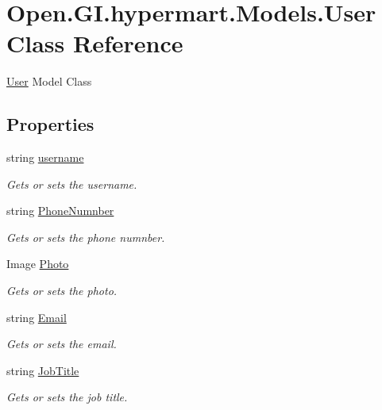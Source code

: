 \hypertarget{class_open_1_1_g_i_1_1hypermart_1_1_models_1_1_user}{}\section{Open.\+G\+I.\+hypermart.\+Models.\+User Class Reference}
\label{class_open_1_1_g_i_1_1hypermart_1_1_models_1_1_user}


\hyperlink{class_open_1_1_g_i_1_1hypermart_1_1_models_1_1_user}{User} Model Class  


\subsection*{Properties}
\begin{DoxyCompactItemize}
\item 
string \hyperlink{class_open_1_1_g_i_1_1hypermart_1_1_models_1_1_user_a8681bb284b2bce5e87537a5dedc2dc05}{username}
\begin{DoxyCompactList}\small\item\em Gets or sets the username. \end{DoxyCompactList}\item 
string \hyperlink{class_open_1_1_g_i_1_1hypermart_1_1_models_1_1_user_a70e545515c09bf8fc7a646c8f1a883a2}{Phone\+Numnber}
\begin{DoxyCompactList}\small\item\em Gets or sets the phone numnber. \end{DoxyCompactList}\item 
Image \hyperlink{class_open_1_1_g_i_1_1hypermart_1_1_models_1_1_user_ae5b46912f2c2765d720a0a4754cc1921}{Photo}
\begin{DoxyCompactList}\small\item\em Gets or sets the photo. \end{DoxyCompactList}\item 
string \hyperlink{class_open_1_1_g_i_1_1hypermart_1_1_models_1_1_user_a7b16ff0fd873d16ef921cd94f89be6f5}{Email}
\begin{DoxyCompactList}\small\item\em Gets or sets the email. \end{DoxyCompactList}\item 
string \hyperlink{class_open_1_1_g_i_1_1hypermart_1_1_models_1_1_user_ad0aa7cba72b233858607496eb693d149}{Job\+Title}
\begin{DoxyCompactList}\small\item\em Gets or sets the job title. \end{DoxyCompactList}\end{DoxyCompactItemize}


